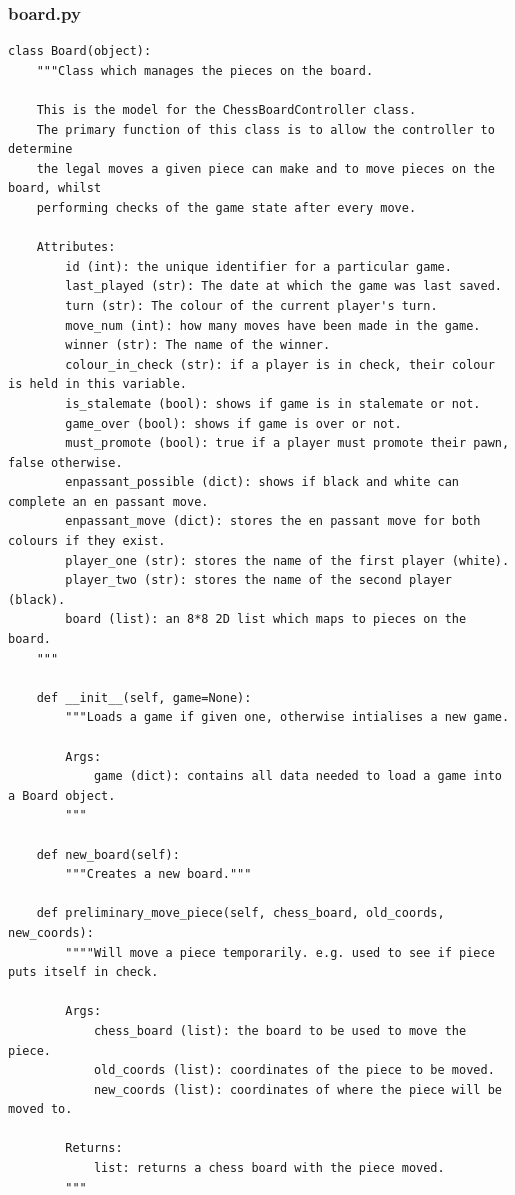 \subsubsection{board.py}
\begin{verbatim}
class Board(object):
    """Class which manages the pieces on the board.

	This is the model for the ChessBoardController class.
	The primary function of this class is to allow the controller to determine
	the legal moves a given piece can make and to move pieces on the board, whilst
	performing checks of the game state after every move.
	
	Attributes:
		id (int): the unique identifier for a particular game.
		last_played (str): The date at which the game was last saved.
		turn (str): The colour of the current player's turn.
		move_num (int): how many moves have been made in the game.
		winner (str): The name of the winner.
		colour_in_check (str): if a player is in check, their colour is held in this variable.
		is_stalemate (bool): shows if game is in stalemate or not.
		game_over (bool): shows if game is over or not.
		must_promote (bool): true if a player must promote their pawn, false otherwise.
		enpassant_possible (dict): shows if black and white can complete an en passant move.
		enpassant_move (dict): stores the en passant move for both colours if they exist.
		player_one (str): stores the name of the first player (white).
		player_two (str): stores the name of the second player (black).
		board (list): an 8*8 2D list which maps to pieces on the board.
	"""
	
	def __init__(self, game=None):
		"""Loads a game if given one, otherwise intialises a new game.
	
		Args:
			game (dict): contains all data needed to load a game into a Board object.
		"""
		
    def new_board(self):
		"""Creates a new board."""
		
	def preliminary_move_piece(self, chess_board, old_coords, new_coords):
		""""Will move a piece temporarily. e.g. used to see if piece puts itself in check.
	
		Args:
			chess_board (list): the board to be used to move the piece.
			old_coords (list): coordinates of the piece to be moved.
			new_coords (list): coordinates of where the piece will be moved to.
		
		Returns:
			list: returns a chess board with the piece moved.
		"""
		

\end{verbatim}
